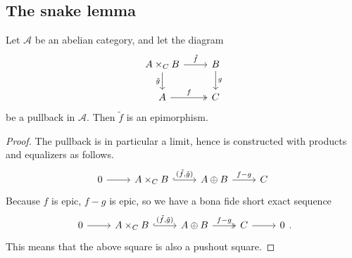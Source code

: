 \documentclass[main.tex]{subfiles}
\begin{document}
\subsection{The snake lemma}
\label{ssc:the_snake_lemma}

\begin{lemma}
  \label{lemma:pullback_of_epi_is_epi}
  Let $\mathcal{A}$ be an abelian category, and let the diagram
  \begin{equation*}
    \begin{tikzcd}
      A \times_{C} B
      \arrow[r, "\tilde{f}"]
      \arrow[d, swap, "\tilde{g}"]
      & B
      \arrow[d, "g"]
      \\
      A
      \arrow[r, two heads, "f"]
      & C
    \end{tikzcd}
  \end{equation*}
  be a pullback in $\mathcal{A}$. Then $\tilde{f}$ is an epimorphism.
\end{lemma}
\begin{proof}
  The pullback is in particular a limit, hence is constructed with products and equalizers as follows.
  \begin{equation*}
    \begin{tikzcd}
      0
      \arrow[r]
      & A \times_{C} B
      \arrow[r, hook, "{(\tilde{f}, \tilde{g})}"]
      & A \oplus B
      \arrow[r, "f - g"]
      & C
    \end{tikzcd}
  \end{equation*}
  Because $f$ is epic, $f - g$ is epic, so we have a bona fide short exact sequence
  \begin{equation*}
    \begin{tikzcd}
      0
      \arrow[r]
      & A \times_{C} B
      \arrow[r, hook, "{(\tilde{f}, \tilde{g})}"]
      & A \oplus B
      \arrow[r, two heads, "f - g"]
      & C
      \arrow[r]
      & 0
    \end{tikzcd}.
  \end{equation*}
  This means that the above square is also a pushout square.
\end{proof}
\end{document}
